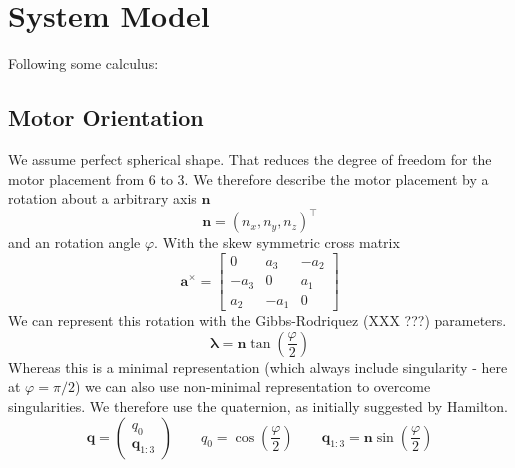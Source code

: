 \chapter{System Model}
\label{sec:sysmod}

Following some calculus:

\section{Motor Orientation}
We assume perfect spherical shape. That reduces the degree of freedom for the motor placement from 6 to 3. We therefore describe the motor placement by a rotation about a arbitrary axis $\mathbf{n}$
\begin{equation}
\mathbf{n} = \left(n_x, n_y, n_z\right)^\top
\end{equation}
and an rotation angle $\varphi$.
With the skew symmetric cross matrix
\begin{equation}
\textbf{a}^\times = \left[
\begin{array}{ccc}
0 & a_3 & -a_2 \\
-a_3 & 0 & a_1 \\
a_2 & -a_1 & 0
\end{array} \right]
\end{equation}
We can represent this rotation with the Gibbs-Rodriquez (XXX ???) parameters.
\begin{equation}
\boldsymbol{\lambda} = \mathbf{n}\tan{\left(\frac{\varphi}{2}\right)}
\end{equation}
Whereas this is a minimal representation (which always include singularity - here at $\varphi=\pi / 2$) we can also use non-minimal representation to overcome singularities. We therefore use the quaternion, as initially suggested by Hamilton.
\begin{equation}
\mathbf{q} = \left( \begin{array}{c} 
q_0 \\ \mathbf{q}_{1:3} 
\end{array} \right) \qquad
q_0 = \cos\left(\frac{\varphi}{2}\right) \qquad
\mathbf{q}_{1:3} = \mathbf{n}\sin\left(\frac{\varphi}{2}\right)
\end{equation}


